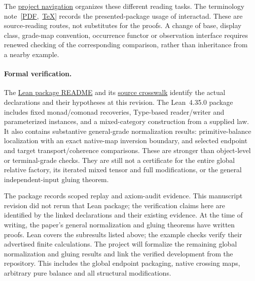 \documentclass[11pt]{article}
\numberwithin{equation}{section}
\theoremstyle{definition}\newtheorem{definition}[theorem]{Definition}
\begin{document}
The
\href{https://github.com/eternal-november/eos-research-programmes/blob/main/projects/contextual-composition/NAVIGATION.md}{project navigation}
organizes these different reading tasks. The
terminology note~\mbox{[\href{https://github.com/eternal-november/eos-research-programmes/blob/10e771644cfdf58c3d05e989e4b26cae7164c80a/projects/contextual-composition/foundations/terminology/Interactad_Terminology_Note.pdf}{PDF}, \href{https://github.com/eternal-november/eos-research-programmes/blob/10e771644cfdf58c3d05e989e4b26cae7164c80a/projects/contextual-composition/foundations/terminology/Interactad_Terminology_Note.tex}{TeX}]}
records the presented-package usage of interactad. These are source-reading
routes, not substitutes for the proofs. A change of base, display class,
grade-map convention, occurrence functor or observation interface requires
renewed checking of the corresponding comparison, rather than inheritance
from a nearby example.

\paragraph{Formal verification.}
The
\href{https://github.com/eternal-november/eos-research-programmes/blob/fc2d2648058191b79b297a15161e85605cb13bb8/projects/contextual-composition/foundations/relative-construction/lean/README.md}{Lean package README}
and its
\href{https://github.com/eternal-november/eos-research-programmes/blob/fc2d2648058191b79b297a15161e85605cb13bb8/projects/contextual-composition/foundations/relative-construction/lean/SOURCE_CROSSWALK.md}{source crosswalk}
identify the actual declarations and their hypotheses at this revision.
The Lean~4.35.0 package includes fixed monad/comonad recoveries, Type-based
reader/writer and parameterized instances, and a mixed-category construction
from a supplied law. It also contains substantive general-grade
normalization results: primitive-balance localization with an exact
native-map inversion boundary, and selected endpoint and target
transport/coherence comparisons. These are stronger than object-level
or terminal-grade checks. They are still not a certificate for the entire
global relative factory, its iterated mixed tensor and full modifications,
or the general independent-input gluing theorem.

The package records scoped replay and axiom-audit evidence. This manuscript
revision did not rerun that Lean package; the verification claims here are
identified by the linked declarations and their existing evidence.
At the time of writing, the paper's general normalization and gluing
theorems have written proofs. Lean covers the subresults listed above;
the example checks verify their advertised finite calculations. The project will
formalize the remaining global normalization and gluing results and link
the verified development from the repository. This includes the global
endpoint packaging, native crossing maps, arbitrary pure balance and all
structural modifications.
\end{document}
